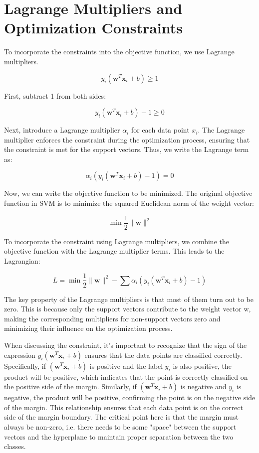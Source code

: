 \section{Lagrange Multipliers and Optimization Constraints}

To incorporate the constraints into the objective function, we use Lagrange multipliers.

\[
y_i (\mathbf{w}^T \mathbf{x}_i + b) \geq 1
\]

First, subtract 1 from both sides:

\[
y_i (\mathbf{w}^T \mathbf{x}_i + b) - 1 \geq 0
\]

Next, introduce a Lagrange multiplier \( \alpha_i \) for each data point \( x_i \). The Lagrange multiplier enforces the constraint during the optimization process, ensuring that the constraint is met for the support vectors. Thus, we write the Lagrange term as:

\[
\alpha_i \left( y_i (\mathbf{w}^T \mathbf{x}_i + b) - 1 \right) = 0
\]

Now, we can write the objective function to be minimized. The original objective function in SVM is to minimize the squared Euclidean norm of the weight vector:

\[
\min \frac{1}{2} \| \mathbf{w} \|^2
\]

To incorporate the constraint using Lagrange multipliers, we combine the objective function with the Lagrange multiplier terms. This leads to the Lagrangian:

\[
L = \min \frac{1}{2} \| \mathbf{w} \|^2 - \sum \alpha_i \left( y_i (\mathbf{w}^T \mathbf{x}_i + b) - 1 \right)
\]

The key property of the Lagrange multipliers is that most of them turn out to be zero. This is because only the support vectors contribute to the weight vector w, making the corresponding multipliers for non-support vectors zero and minimizing their influence on the optimization process.

When discussing the constraint, it's important to recognize that the sign of the expression \( y_i (\mathbf{w}^T \mathbf{x}_i + b) \) ensures that the data points are classified correctly. Specifically, if \( (\mathbf{w}^T \mathbf{x}_i + b) \) is positive and the label \( y_i \) is also positive, the product will be positive, which indicates that the point is correctly classified on the positive side of the margin. Similarly, if \( (\mathbf{w}^T \mathbf{x}_i + b) \) is negative and \( y_i \) is negative, the product will be positive, confirming the point is on the negative side of the margin. This relationship ensures that each data point is on the correct side of the margin boundary. The critical point here is that the margin must always be non-zero, i.e. there needs to be some "space" between the support vectors and the hyperplane to maintain proper separation between the two classes.


